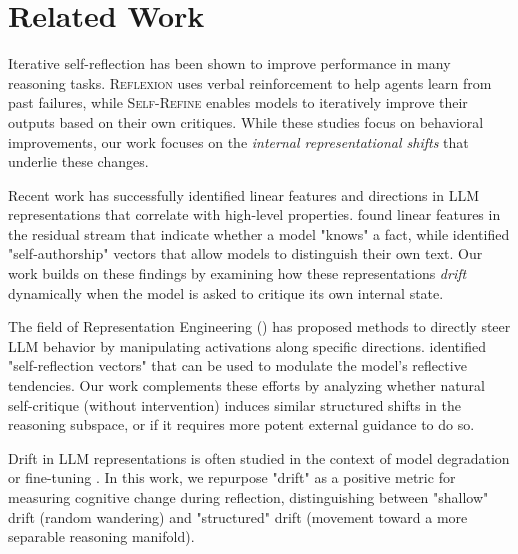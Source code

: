 \section{Related Work}
\label{sec:related_work}

 Iterative self-reflection has been shown to improve performance in many reasoning tasks. \textsc{Reflexion} \citep{shinn2023reflexion} uses verbal reinforcement to help agents learn from past failures, while \textsc{Self-Refine} \citep{madaan2023selfrefine} enables models to iteratively improve their outputs based on their own critiques. While these studies focus on behavioral improvements, our work focuses on the \textit{internal representational shifts} that underlie these changes.

 Recent work has successfully identified linear features and directions in LLM representations that correlate with high-level properties. \citet{tamoyan2025factual} found linear features in the residual stream that indicate whether a model "knows" a fact, while \citet{ackerman2024inspection} identified "self-authorship" vectors that allow models to distinguish their own text. Our work builds on these findings by examining how these representations \textit{drift} dynamically when the model is asked to critique its own internal state.

 The field of Representation Engineering (\repe) \citep{yan2025reflctrl} has proposed methods to directly steer LLM behavior by manipulating activations along specific directions. \citet{zhu2025emergencecontrol} identified "self-reflection vectors" that can be used to modulate the model's reflective tendencies. Our work complements these efforts by analyzing whether natural self-critique (without intervention) induces similar structured shifts in the reasoning subspace, or if it requires more potent external guidance to do so.

 Drift in LLM representations is often studied in the context of model degradation or fine-tuning \citep{xing2025brainrot}. In this work, we repurpose "drift" as a positive metric for measuring cognitive change during reflection, distinguishing between "shallow" drift (random wandering) and "structured" drift (movement toward a more separable reasoning manifold).
